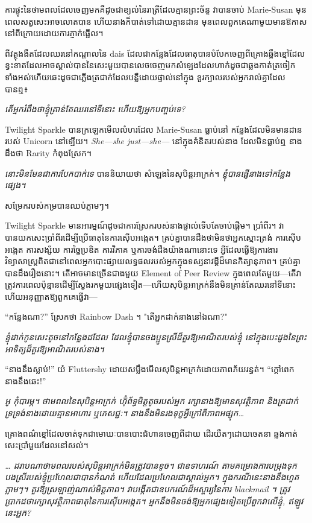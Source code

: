 ការផ្ទុះនៃថាមពលដែលចេញមកគឺដូចជាខ្យល់នៃរាត្រីដែលគ្មានព្រះច័ន្ទ វាបានចាប់ Marie-Susan មុនពេលសត្វសេះអាចលោតបាន ហើយនាងក៏បាត់ទៅដោយគ្មានដាន មុនពេលពួកគេណាមួយមានឱកាសនៅពីក្រោយដោយការភ្ញាក់ផ្អើល។

ពីវត្ថុងងឹតដែលឈរនៅកណ្តាលនៃ dais ដែលជាកន្លែងដែលធាតុបានបំបែកចេញពីគ្រោងឆ្អឹងខ្មៅដែលខ្វះខាតដែលអាចស្គាល់បាននៃសេះមួយបានលេចចេញមកសំឡេងដែលហាក់ដូចជាឆ្លងកាត់ត្រចៀកទាំងអស់ហើយឆេះដូចជាភ្លើងត្រជាក់ដែលបន្លឺដោយផ្ទាល់នៅក្នុង ខួរក្បាលរបស់អ្នករាល់គ្នាដែលបានឮ៖

\emph{តើអ្នករំពឹងថាខ្ញុំគ្រាន់តែឈរនៅទីនោះ ហើយឱ្យអ្នកបញ្ចប់ទេ?}

Twilight Sparkle បានក្រឡេកមើលលំហរដែល Marie-Susan ធ្លាប់នៅ កន្លែងដែលមិនមានដានរបស់ Unicorn នៅឡើយ។ \emph{She—she just—she—} នៅក្នុងគំនិតរបស់នាង ដែលមិនធ្លាប់ឮ នាងដឹងថា Rarity កំពុងស្រែក។

\emph{នោះមិនមែនជាការបែកបាក់ទេ} បាននិយាយថា សំឡេងនៃសុបិន្តអាក្រក់។ \emph{ខ្ញុំបានផ្ញើនាងទៅកន្លែងផ្សេង។}

សម្រែក​របស់​កម្រ​បាន​ឈប់​ភ្លាមៗ។

Twilight Sparkle មានអារម្មណ៍ដូចជាការស្រែករបស់នាងផ្ទាល់ទើបតែចាប់ផ្តើម។ ប្រាំពីរ។ វាបានយកសេះប្រាំពីរដើម្បីប្រើធាតុនៃការស៊ើបអង្កេត។ គ្រប់​គ្នា​បាន​ដឹង​ថា​មិន​ថា​អ្នក​ស្មោះត្រង់ ការ​ស៊ើប​អង្កេត ការ​សង្ស័យ ការ​ច្នៃប្រឌិត ការ​វិភាគ ឬ​ការ​ចង់​ដឹង​យ៉ាង​ណា​នោះ​ទេ អ្វី​ដែល​ធ្វើ​ឱ្យ​ការងារ​វិទ្យាសាស្ត្រ​ពិត​ជា​នៅ​ពេល​អ្នក​បោះផ្សាយ​លទ្ធផល​របស់​អ្នក​ក្នុង​ទស្សនាវដ្ដី​ដ៏​មាន​កិត្យានុភាព។ គ្រប់គ្នាបានដឹងរឿងនោះ។ តើអាចមានច្រើនជាងមួយ Element of Peer Review ក្នុងពេលតែមួយ—តើវាត្រូវការពេលប៉ុន្មានដើម្បីស្វែងរកមួយផ្សេងទៀត—ហើយសុបិន្តអាក្រក់នឹងមិនគ្រាន់តែឈរនៅទីនោះ ហើយអនុញ្ញាតឱ្យពួកគេធ្វើវា—

“កន្លែងណា?” ស្រែកថា Rainbow Dash ។ "តើអ្នកដាក់នាងនៅឯណា?"

\emph{ខ្ញុំដាក់កូនសេះតូចនៅកន្លែងដដែល ដែលខ្ញុំបានចងប្អូនស្រីដ៏គួរឱ្យអាណិតរបស់ខ្ញុំ នៅក្នុងបេះដូងនៃព្រះអាទិត្យដ៏គួរឱ្យអាណិតរបស់នាង។}

“នាងនឹងស្លាប់!” យំ Fluttershy ដោយសម្លឹងមើលសុបិន្តអាក្រក់ដោយភាពភ័យរន្ធត់។ “ក្តៅពេក នាងនឹងឆេះ!”

\emph{ អូ កុំបារម្ភ។ ថាមពលនៃសុបិន្តអាក្រក់ ហ៊ុំព័ទ្ធមិត្តតូចរបស់អ្នក រក្សានាងឱ្យមានសុវត្ថិភាព និងត្រជាក់ ទ្រទ្រង់នាងដោយគ្មានអាហារ ឬភេសជ្ជៈ។ នាងនឹងមិនរងទុក្ខអ្វីក្រៅពីភាពអផ្សុក…}

គ្រោងពណ៌ខ្មៅដែលចាត់ទុកជាមោឃៈបានបោះជំហានចេញពីដាយ ដើរយឺតៗដោយចេតនា ឆ្លងកាត់សេះប្រាំមួយដែលនៅសល់។

\emph{… ដរាបណាថាមពលរបស់សុបិន្តអាក្រក់មិនត្រូវបានខូច។ ជាឧទាហរណ៍ តាមគម្រោងការបម្រុងទុក បងស្រីរបស់ខ្ញុំប្រហែលជាបានកំណត់ ហើយដែលប្រហែលជាស្គាល់អ្នក។ ក្នុងករណីនេះនាងនឹងហួតភ្លាមៗ។ គួរឱ្យស្រឡាញ់ណាស់មិត្តភាព។ វាបង្កើតជាឧបករណ៍ដ៏អស្ចារ្យនៃការ blackmail ។ ត្រូវប្រាកដថារក្សាសុវត្ថិភាពធាតុនៃការស៊ើបអង្កេត។ អ្នក​នឹង​មិន​ចង់​ឱ្យ​អ្នក​ផ្សេង​ទៀត​ប្រើ​ពួក​វា​លើ​ខ្ញុំ, ឥឡូវ​នេះ​អ្នក​?}


